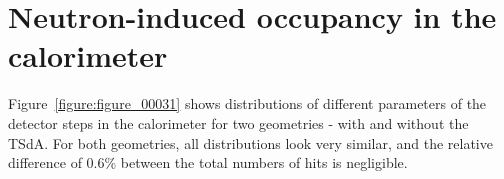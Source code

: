 \documentclass[12pt]{article}
\begin{document}


\newpage
\section{Neutron-induced occupancy in the calorimeter}

Figure~\ref{figure:figure_00031} shows distributions of different
parameters of the detector steps in the calorimeter for two geometries - with and without
the TSdA.
%
For both geometries, all distributions look very similar, and the relative difference
of 0.6\% between the total numbers of hits is negligible.
\end{document}
